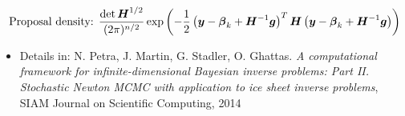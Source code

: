 \documentclass[10pt,final,xcolor=dvipsnames]{beamer}
\begin{document}
\begin{frame}
 \begin{align*}
     \mbox{ Proposal density: } \frac { \det \boldsymbol{H}^{1/2} }{(2\pi)^{n/2} }
      \exp \left( - \frac 12 \left( \boldsymbol{y} - \boldsymbol{\beta}_k + \boldsymbol{H}^{-1} \boldsymbol{g} \right) ^T \boldsymbol{H} \left( \boldsymbol{y} - \boldsymbol{\beta}_k + \boldsymbol{H}^{-1} \boldsymbol{g} \right)
      \right)
 \end{align*}
 
\begin{itemize}
\item [] \scriptsize{Details in: N. Petra, J. Martin, G. Stadler,
  O. Ghattas. {\em A computational framework for
    infinite-dimensional Bayesian inverse problems: Part
    II. Stochastic Newton MCMC with application to ice sheet inverse
    problems}, SIAM Journal on Scientific Computing, 2014}
\end{itemize}

\end{frame}
\end{document}
